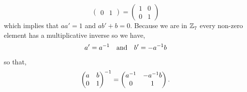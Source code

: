 \documentclass[MathsNotesBase.tex]{subfiles}
\begin{document}
{\begin{itemize}
{\[\begin{pmatrix}
				0 & 1
				\end{pmatrix}
				=
				\begin{pmatrix}
				1 & 0 \\
				0 & 1
				\end{pmatrix}
			\]
			which implies that ${ aa' = 1 }$ and ${ ab' + b = 0 }$. Because we are in $\mathbb{Z}^{}_7$ every non-zero element has a multiplicative inverse so we have,
			\[ a' = {a}^{-1} \hspace{10pt}\text{and}\hspace{10pt} b' = -{a}^{-1}b \]
			so that,
			\[
				{\begin{pmatrix}
				a & b \\
				0 & 1
				\end{pmatrix}}^{-1}
				=
				\begin{pmatrix}
				{a}^{-1} & -{a}^{-1}b \\
				0 & 1
				\end{pmatrix}.
			\]
		}
		\end{itemize}
		
		\bigskip
}
\end{document}
